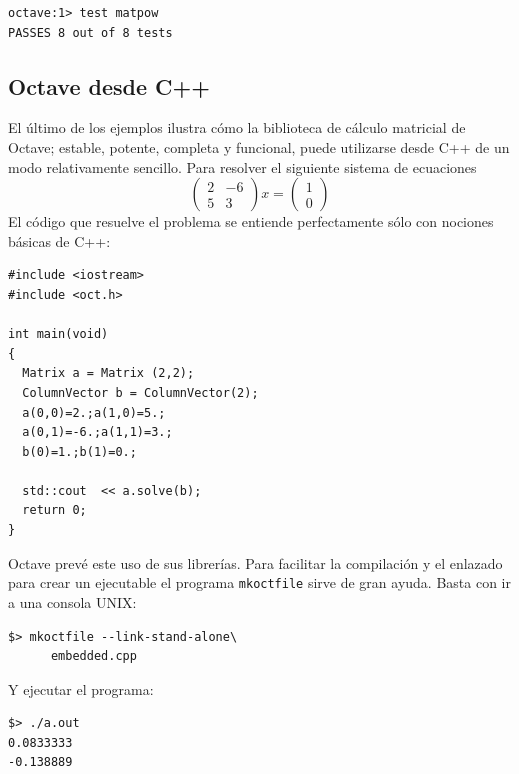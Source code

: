 \documentclass[10pt,letterpaper,conference]{ieeeconfspanish}
\begin{document}
\begin{verbatim}
octave:1> test matpow
PASSES 8 out of 8 tests
\end{verbatim}



\hypertarget{octave-desde-c}{}
\subsection*{Octave desde C++}

El último de los ejemplos ilustra cómo la biblioteca de cálculo
matricial de Octave; estable, potente, completa y funcional, puede
utilizarse desde C++ de un modo relativamente sencillo.  Para resolver
el siguiente sistema de ecuaciones
\[
\left( \begin{array}{cc}
2 & -6 \\
5 & 3
\end{array}\right)x=
\left( \begin{array}{c}
1 \\
0 \end{array} \right)
\]
El código que resuelve el problema se entiende perfectamente sólo con
nociones básicas de C++:
\begin{verbatim}
#include <iostream>
#include <oct.h>

int main(void)
{
  Matrix a = Matrix (2,2);
  ColumnVector b = ColumnVector(2);
  a(0,0)=2.;a(1,0)=5.;
  a(0,1)=-6.;a(1,1)=3.;
  b(0)=1.;b(1)=0.;

  std::cout  << a.solve(b);
  return 0;
}
\end{verbatim}

Octave prevé este uso de sus librerías.  Para facilitar la compilación
y el enlazado para crear un ejecutable el programa \texttt{mkoctfile} sirve
de gran ayuda.  Basta con ir a una consola UNIX:


\begin{verbatim}
$> mkoctfile --link-stand-alone\
      embedded.cpp
\end{verbatim}


Y ejecutar el programa:
\begin{verbatim}
$> ./a.out
0.0833333
-0.138889
\end{verbatim}



\hypertarget{conclusiones-finales}{}
\end{document}
